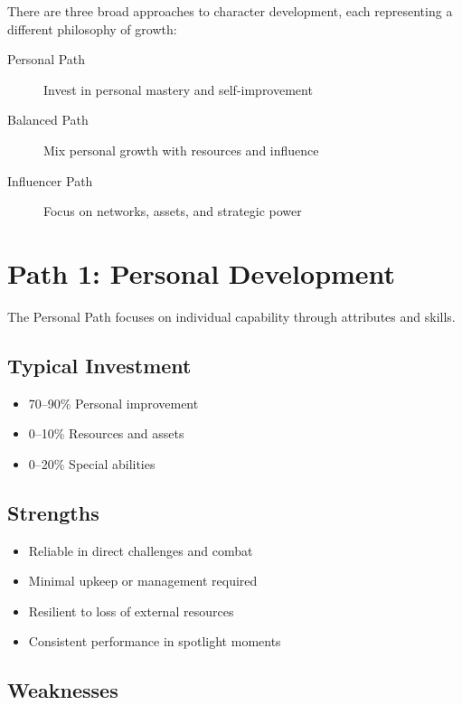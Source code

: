 \documentclass[11pt,twoside,openany]{book}
\begin{document}
There are three broad approaches to character development, each representing a different philosophy of growth:

\begin{description}
\item[Personal Path] Invest in personal mastery and self-improvement
\item[Balanced Path] Mix personal growth with resources and influence
\item[Influencer Path] Focus on networks, assets, and strategic power
\end{description}

\section*{Path 1: Personal Development} 

The Personal Path focuses on individual capability through attributes and skills.

\subsection*{Typical Investment}

\begin{itemize}
\item 70--90\% Personal improvement
\item 0--10\% Resources and assets
\item 0--20\% Special abilities
\end{itemize}

\subsection*{Strengths}

\begin{itemize}
\item Reliable in direct challenges and combat
\item Minimal upkeep or management required
\item Resilient to loss of external resources
\item Consistent performance in spotlight moments
\end{itemize}

\subsection*{Weaknesses}
\end{document}
